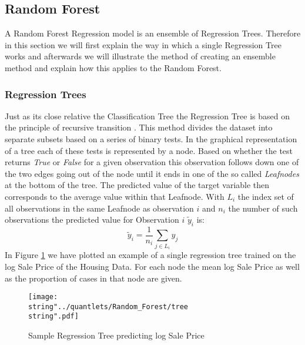 \subsection{Random Forest}
A Random Forest Regression model is an ensemble of Regression Trees. Therefore in this section we will first explain the way in which a single Regression Tree works and afterwards we will illustrate the method of creating an ensemble method and explain how this applies to the Random Forest.
\subsubsection{Regression Trees}
Just as its close relative the Classification Tree the Regression Tree is based on the principle of recursive transition \cite{liaw_classification_2002}. This method divides the dataset into separate subsets based on a series of binary tests. In the graphical representation of a tree each of these tests is represented by a node. Based on whether the test returns \textit{True} or \textit{False} for a given observation this observation follows down one of the two edges going out of the node until it ends in one of the so called \textit{Leafnodes} at the bottom of the tree. The predicted value of the target variable then corresponds to the average value within that Leafnode. With $L_i$ the index set of all observations in the same Leafnode as observation $i$ and $n_i$ the number of such observations the predicted value for Observation $i$ $\tilde{y}_i$ is:
$$\tilde{y}_i = \frac{1}{n_i}\sum_{j \in L_i} y_j$$
In Figure  \ref{fig:tree} we have plotted an example of a single regression tree trained on the log Sale Price of the Housing Data. For each node the mean log Sale Price as well as the proportion of cases in that node are given. 
\begin{figure}
  \centering
\texttt{[image: \\string"../quantlets/Random\_Forest/tree\\string".pdf]}
  \caption{Sample Regression Tree predicting log Sale Price}\label{fig:tree}
\end{figure}

